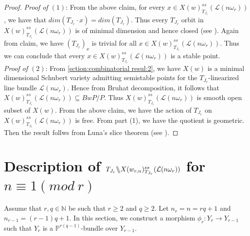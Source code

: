 \documentclass[12pt,reqno]{amsart}
\numberwithin{equation}{section}
\theoremstyle{definition}
\newcommand{\GmodX}[3]{#1 \backslash\mkern-6mu\backslash #2^{ss}_{#1}(#3)}
\begin{document}
\begin{proof}
{\it Proof of $(1)$}: From the above claim,
 for every $x\in 	X(w)^{ss}_{T_{J_{r}}}(\mathcal{L}(n\omega_{r}))$, we have that $dim(T_{J_{r}}\cdot x)=dim (T_{J_{r}})$. Thus every $T_{J_{r}}$ orbit in $X(w)^{ss}_{T_{J_{r}}}(\mathcal{L}(n\omega_{r}))$ is of minimal dimension and hence closed (see \cite[Proposition 8.3]{Hum2}). Again from claim, we have $(T_{J_{r}})_{x}$ is trivial for all  $x\in 	X(w)^{ss}_{T_{J_{r}}}(\mathcal{L}(n\omega_{r}))$. Thus we can conclude that every 
	$x\in 	X(w)^{ss}_{T_{J_{r}}}(\mathcal{L}(n\omega_{r}))$ is a stable point.\\
	{\it Proof of $(2)$}: From \cref{sction:combinatorial resul:2}, we have $X(w)$ is a minimal dimensional Schubert variety admitting semistable points for the $T_{J_{r}}$-linearized line bundle $\mathcal{L}(n\omega_{r})$. Hence from Bruhat decomposition, it follows that $X(w)^{ss}_{T_{J_{r}}}(\mathcal{L}(n\omega_{r}))\subseteq BwP/P$. Thus $X(w)^{ss}_{T_{J_{r}}}(\mathcal{L}(n\omega_{r}))$ is smooth open subset of $X(w)$. From the above claim, we have the action of $T_{J_{r}}$ on $X(w)^{ss}_{T_{J_{r}}}(\mathcal{L}(n\omega_{r}))$ is free. From part (1), we have the quotient is geometric. Then the result follws from Luna's slice theorem (see \cite[Proposition 5.7]{Luna}).
\end{proof}
\section{Description of  $\GmodX{T_{J_{r}}}{X(w_{r,n})}{\mathcal{L}(n\omega_{r})}$ for $n\equiv 1 (mod \ r)$}\label{section 5}
Assume that $r,q\in\mathbb{N}$ be such that $r\geq 2$ and $q\geq 2$. Let $n_{r}=n=rq+1$ and $n_{r-1}=(r-1)q+1$. In this section, we construct a morphism $\phi_{r}:Y_{r}\longrightarrow Y_{r-1}$ such that  $Y_{r}$ is a $\mathbb{P}^{r(q-1)}$-bundle over $Y_{r-1}$.
\end{document}
